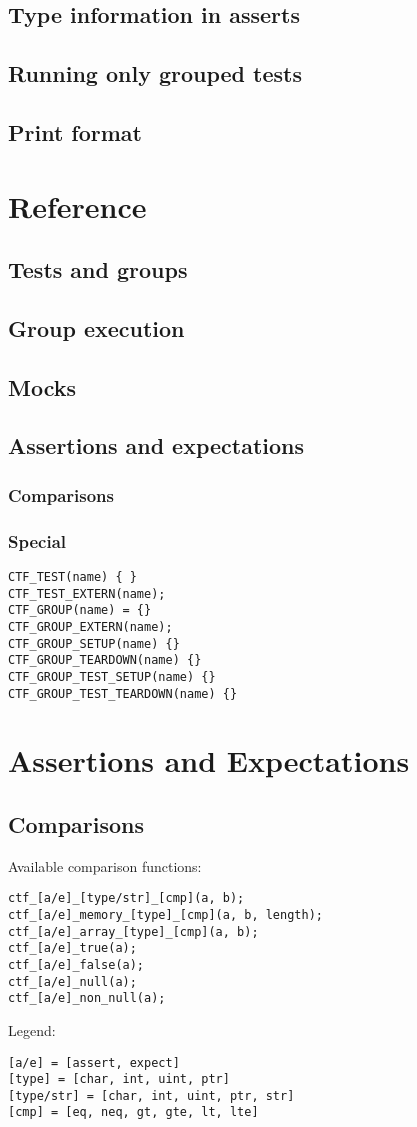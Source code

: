 \documentclass[12pt]{article}
\begin{document}
\subsection{Type information in asserts}
\subsection{Running only grouped tests}
\subsection{Print format}
\section{Reference}
\subsection{Tests and groups}
\subsection{Group execution}
\subsection{Mocks}
\subsection{Assertions and expectations}
\subsubsection{Comparisons}
\subsubsection{Special}


\begin{verbatim}
CTF_TEST(name) { }
CTF_TEST_EXTERN(name);
CTF_GROUP(name) = {}
CTF_GROUP_EXTERN(name);
CTF_GROUP_SETUP(name) {}
CTF_GROUP_TEARDOWN(name) {}
CTF_GROUP_TEST_SETUP(name) {}
CTF_GROUP_TEST_TEARDOWN(name) {}
\end{verbatim}
\section{Assertions and Expectations}
\subsection{Comparisons}
Available comparison functions:
\begin{verbatim}
ctf_[a/e]_[type/str]_[cmp](a, b);
ctf_[a/e]_memory_[type]_[cmp](a, b, length);
ctf_[a/e]_array_[type]_[cmp](a, b);
ctf_[a/e]_true(a);
ctf_[a/e]_false(a);
ctf_[a/e]_null(a);
ctf_[a/e]_non_null(a);
\end{verbatim}
Legend:
\begin{verbatim}
[a/e] = [assert, expect]
[type] = [char, int, uint, ptr]
[type/str] = [char, int, uint, ptr, str]
[cmp] = [eq, neq, gt, gte, lt, lte]
\end{verbatim}
\end{document}
